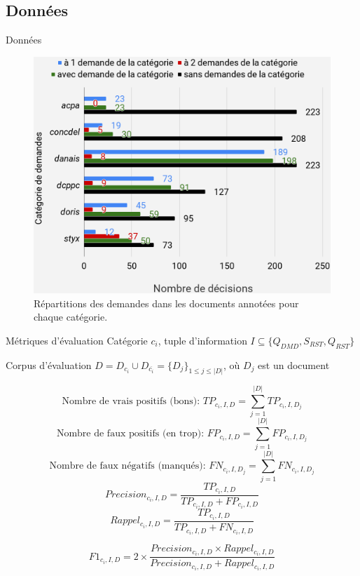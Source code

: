 \documentclass[newPxFont,pagenumber]{beamer}
\begin{document}
\subsection{Données}
\begin{frame}{Données}
\begin{figure}
\includegraphics[width=\textwidth]{chartDataset.png}
\caption{Répartitions des demandes dans les documents annotées pour chaque catégorie.}
\end{figure}
\end{frame}

\begin{frame}{Métriques d'évaluation}
Catégorie  $c_i$, tuple d'information $I \subseteq \lbrace Q_{DMD}, S_{RST}, Q_{RST} \rbrace $

Corpus d'évaluation  $D = D_{c_i} \cup D_{\overline{c_i}} = \lbrace D_j\rbrace_{1\leq j\leq \vert D \vert}$, où $D_j$  est un document

\scriptsize
\[\text{Nombre de vrais positifs (bons): } TP_{c_i,I,D} = \sum\limits^{\vert D \vert}_{j=1} TP_{c_i,I,D_j}\] 
\[\text{Nombre de faux positifs (en trop): } FP_{c_i,I,D} = \sum\limits^{\vert D \vert}_{j=1} FP_{c_i,I,D_j}\] 
\[\text{Nombre de faux négatifs (manqués): } FN_{c_i,I,D_j} = \sum\limits^{\vert D \vert}_{j=1} FN_{c_i,I,D_j}\]
\[Precision_{c_i,I,D} = \frac{TP_{c_i,I,D}}{TP_{c_i,I,D} + FP_{c_i,I,D}}\]
\[Rappel_{c_i,I,D} = \frac{TP_{c_i,I,D}}{TP_{c_i,I,D} + FN_{c_i,I,D}}\]

\[F1_{c_i,I,D} =2 \times \frac{Precision_{c_i,I,D} \times Rappel_{c_i,I,D}}{Precision_{c_i,I,D} + Rappel_{c_i,I,D}}\]


\end{frame}
\end{document}
